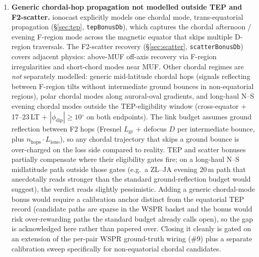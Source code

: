 \documentclass[11pt,a4paper]{article}
\newcommand{\degree}{\ensuremath{{}^\circ}}
\begin{document}
\begin{enumerate}[leftmargin=*]
  \item \textbf{Generic chordal-hop propagation not modelled
        outside TEP and F2-scatter.}  ionocast explicitly models
        one chordal mode, trans-equatorial propagation
        (\S\ref{sec:tep}, \texttt{tepBonusDb}), which captures
        the chordal afternoon / evening F-region mode across
        the magnetic equator that skips multiple D-region
        traversals.  The F2-scatter recovery
        (\S\ref{sec:scatter}, \texttt{scatterBonusDb}) covers
        adjacent physics: above-MUF off-axis recovery via
        F-region irregularities and short-chord modes near
        MUF.  Other chordal regimes are \emph{not} separately
        modelled: generic mid-latitude chordal hops (signals
        reflecting between F-region tilts without intermediate
        ground bounces in non-equatorial regions), polar
        chordal modes along auroral-oval gradients, and
        long-haul N--S evening chordal modes outside the
        TEP-eligibility window (cross-equator $+$ 17--23\,LT
        $+$ $|\phi_{\text{dip}}| \ge 10\degree$ on both
        endpoints).  The link budget assumes ground reflection
        between F2 hops (Fresnel $L_{\text{gr}}$ $+$ defocus
        $D$ per intermediate bounce, plus $n_{\text{hops}}
        \cdot L_{\text{iono}}$), so any chordal trajectory
        that skips a ground bounce is over-charged on the
        loss side compared to reality.  TEP and scatter
        bonuses partially compensate where their
        eligibility gates fire; on a long-haul N--S
        midlatitude path outside those gates (e.g.\ a ZL--JA
        evening 20\,m path that anecdotally reads stronger
        than the standard ground-reflection budget would
        suggest), the verdict reads slightly pessimistic.
        Adding a generic chordal-mode bonus would require a
        calibration anchor distinct from the equatorial TEP
        record (candidate paths are sparse in the WSPR
        basket and the bonus would risk over-rewarding paths
        the standard budget already calls open), so the
        gap is acknowledged here rather than papered over.
        Closing it cleanly is gated on an extension of the
        per-pair WSPR ground-truth wiring (\#9) plus a
        separate calibration sweep specifically for
        non-equatorial chordal candidates.


\end{enumerate}
\end{document}
